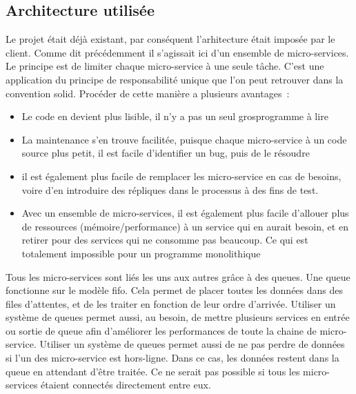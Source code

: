 \documentclass[rapport.tex]{subfiles}
\begin{document}
        \subsection{Architecture utilisée}
            Le projet était déjà existant, par conséquent l'arhitecture était imposée par le client.
            Comme dit précédemment il s'agissait ici d'un ensemble de micro-services. Le principe 
            est de limiter chaque micro-service à une seule tâche. C'est une application du
            principe de responsabilité unique que l'on peut retrouver dans la convention \gls{solid}. Procéder de cette manière a plusieurs avantages~:~
            \begin{itemize}
                \item Le code en devient plus lisible, il n'y a pas un seul
                    \og gros\fg programme à lire
                \item La maintenance s'en trouve facilitée, puisque chaque
                    micro-service à un code source
                    plus petit, il est facile d'identifier un bug, puis de le résoudre
                \item il est également plus facile de remplacer les
                    micro-service en cas de besoins, 
                    voire d'en introduire des répliques dans le processus à des fins de test.
                \item Avec un ensemble de micro-services, il est également plus
                    facile d'allouer plus de ressources (mémoire/performance)
                    à un service qui en aurait besoin, et en retirer pour des
                    services qui ne consomme pas beaucoup. Ce qui est
                    totalement 
                    impossible pour un programme monolithique
            \end{itemize}
            Tous les micro-services sont liés les uns aux autres grâce à des
            queues. Une queue fonctionne sur le modèle \gls{fifo}. Cela permet de placer toutes les données dans
            des files d'attentes, et de les traiter en fonction de leur ordre
            d'arrivée. Utiliser un système de queues permet aussi, au besoin, de
            mettre plusieurs services en entrée ou sortie de
            queue afin d'améliorer les performances de toute la chaine de
            micro-service. Utiliser un système de queues permet aussi de ne pas perdre de données si l'un des micro-service
            est hors-ligne. Dans ce cas, les données restent dans la queue en attendant d'être traitée. Ce ne serait pas
            possible si tous les micro-services étaient connectés directement entre eux.
\end{document}
